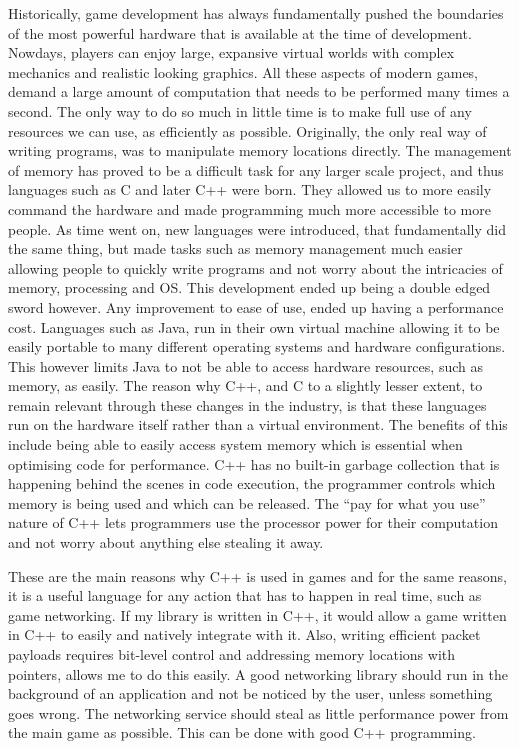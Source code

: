 Historically, game development has always fundamentally pushed the boundaries of the most powerful hardware that is available at the time of development. Nowdays, players can enjoy large, expansive virtual worlds with complex mechanics and realistic looking graphics. All these aspects of modern games, demand a large amount of computation that needs to be performed many times a second. The only way to do so much in little time is to make full use of any resources we can use, as efficiently as possible. Originally, the only real way of writing programs, was to manipulate memory locations directly. The management of memory has proved to be a difficult task for any larger scale project, and thus languages such as C and later C++ were born. They allowed us to more easily command the hardware and made programming much more accessible to more people. As time went on, new languages were introduced, that fundamentally did the same thing, but made tasks such as memory management much easier allowing people to quickly write programs and not worry about the intricacies of memory, processing and OS. This development ended up being a double edged sword however. Any improvement to ease of use, ended up having a performance cost. Languages such as Java, run in their own virtual machine allowing it to be easily portable to many different operating systems and hardware configurations. This however limits Java to not be able to access hardware resources, such as memory, as easily. The reason why C++, and C to a slightly lesser extent, to remain relevant through these changes in the industry, is that these languages run on the hardware itself rather than a virtual environment. The benefits of this include being able to easily access system memory which is essential when optimising code for performance. C++ has no built-in garbage collection that is happening behind the scenes in code execution, the programmer controls which memory is being used and which can be released. The ``pay for what you use'' nature of C++ lets programmers use the processor power for their computation and not worry about anything else stealing it away.

These are the main reasons why C++ is used in games and for the same reasons, it is a useful language for any action that has to happen in real time, such as game networking. If my library is written in C++, it would allow a game written in C++ to easily and natively integrate with it. Also, writing efficient packet payloads requires bit-level control and addressing memory locations with pointers, allows me to do this easily. A good networking library should run in the background of an application and not be noticed by the user, unless something goes wrong. The networking service should steal as little performance power from the main game as possible. This can be done with good C++ programming.


